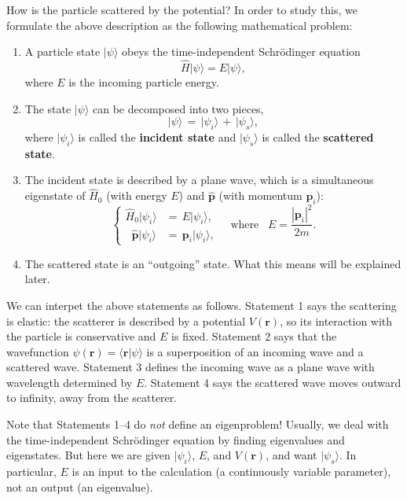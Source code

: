 \documentclass[pra,12pt]{revtex4-2}
\begin{document}
How is the particle scattered by the potential?  In order to study
this, we formulate the above description as the following mathematical
problem:
\begin{enumerate}
\item 
A particle state $|\psi\rangle$ obeys the time-independent
Schr\"odinger equation
\begin{equation}
  \hat{H} |\psi\rangle = E |\psi\rangle,
\end{equation}
where $E$ is the incoming particle energy.

\item
The state $|\psi\rangle$ can be decomposed into two pieces,
\begin{equation}
  |\psi\rangle \,=\, |\psi_i\rangle \,+\, |\psi_s\rangle,
\end{equation}
where $|\psi_i\rangle$ is called the \textbf{incident state} and
$|\psi_s\rangle$ is called the \textbf{scattered state}.

\item
The incident state is described by a plane wave, which is a
simultaneous eigenstate of $\hat{H}_0$ (with energy $E$) and
$\hat{\mathbf{p}}$ (with momentum $\mathbf{p}_i$):
\begin{equation}
  \begin{cases}
  \hat{H}_0 |\psi_i\rangle &= \, E |\psi_i\rangle, \\
  \;\;\hat{\mathbf{p}} |\psi_i\rangle &= \, \mathbf{p}_i |\psi_i\rangle,
  \end{cases}
  \quad \mathrm{where} \;\;\; E = \frac{|\mathbf{p}_i|^2}{2m}.
\end{equation}

\item
The scattered state is an ``outgoing'' state.  What this means will be
explained later.
\end{enumerate}
We can interpet the above statements as follows.  Statement 1 says the
scattering is elastic: the scatterer is described by a potential
$V(\mathbf{r})$, so its interaction with the particle is conservative
and $E$ is fixed.  Statement 2 says that the wavefunction
$\psi(\mathbf{r}) = \langle \mathbf{r} |\psi\rangle$ is a
superposition of an incoming wave and a scattered wave.  Statement 3
defines the incoming wave as a plane wave with wavelength determined
by $E$.  Statement 4 says the scattered wave moves outward to
infinity, away from the scatterer.

Note that Statements 1--4 do \textit{not} define an eigenproblem!
Usually, we deal with the time-independent Schr\"odinger equation by
finding eigenvalues and eigenstates.  But here we are given
$|\psi_i\rangle$, $E$, and $V(\mathbf{r})$, and want $|\psi_s\rangle$.
In particular, $E$ is an input to the calculation (a continuously
variable parameter), not an output (an eigenvalue).
\end{document}
